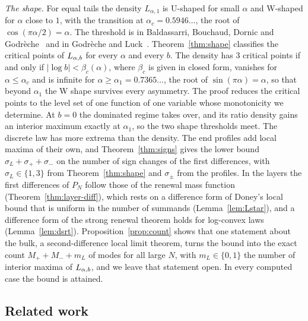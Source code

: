 \emph{The shape.} For equal tails the density $L_{\alpha,1}$ is U-shaped for small $\alpha$ and
W-shaped for $\alpha$ close to $1$, with the transition at $\alpha_c=0.5946\ldots$, the root of
$\cos(\pi\alpha/2)=\alpha$. The threshold is in Baldassarri, Bouchaud, Dornic and
Godr\`eche~\cite{bbdg1999} and in Godr\`eche and Luck~\cite{godrecheluck2001}.
Theorem~\ref{thm:shape} classifies the critical points of $L_{\alpha,b}$ for every $\alpha$ and every
$b$. The density has $3$ critical points if and only if $|\log b|<\beta_c(\alpha)$, where
$\beta_c$ is given in closed form, vanishes for $\alpha\le\alpha_c$ and is infinite for
$\alpha\ge\alpha_1=0.7365\ldots$, the root of $\sin(\pi\alpha)=\alpha$, so that beyond $\alpha_1$
the W shape survives every asymmetry. The proof reduces the critical points to the level set
of one function of one variable whose monotonicity we determine. At $b=0$ the dominated regime
takes over, and its ratio density gains an interior maximum exactly at $\alpha_1$, so the two
shape thresholds meet. The discrete law has more extrema than the density. The end profiles
add local maxima of their own, and Theorem~\ref{thm:signs} gives the lower bound
$\sigma_L+\sigma_\plus+\sigma_\minus$ on the number of sign changes of the first differences,
with $\sigma_L\in\{1,3\}$ from Theorem~\ref{thm:shape} and $\sigma_\pm$ from the profiles.
In the layers the first differences of $P_N$ follow those of the renewal mass function
(Theorem~\ref{thm:layer-diff}), which rests on a difference form of Doney's local bound that is
uniform in the number of summands (Lemma~\ref{lem:Lstar}), and a difference form of the strong
renewal theorem holds for log-convex laws (Lemma~\ref{lem:dsrt}). Proposition~\ref{prop:count} shows
that one statement about the bulk, a second-difference local limit theorem, turns the bound into
the exact count $M_\plus+M_\minus+m_L$ of modes for all large $N$, with $m_L\in\{0,1\}$ the number of
interior maxima of $L_{\alpha,b}$, and we leave that statement open. In every computed case the bound is
attained.

\subsection{Related work}\label{sec:intro-related}

